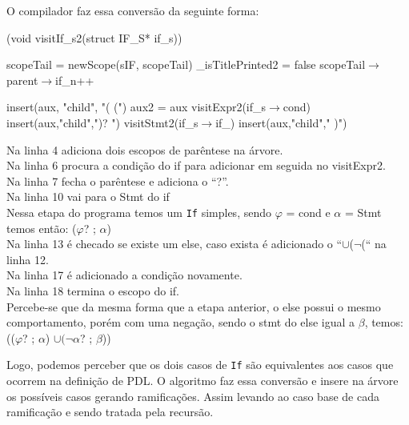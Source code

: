 \documentclass{article}
\newcommand\bruno[1]{({\color{red}#1})}
\begin{document}
	 O compilador faz essa conversão da seguinte forma:\\
	
	\BlankLine
	\begin{algorithm}[H]
		\caption{(void visitIf\_s2(struct IF\_S* if\_s))}
		scopeTail = newScope(sIF, scopeTail)\;
		\_isTitlePrinted2 = false\;
		scopeTail$\rightarrow$parent$\rightarrow$if\_n++\;
		
		insert(aux, "child", "( (")\;
		aux2 = aux\;
		visitExpr2(if\_s$\rightarrow$cond)\;
		insert(aux,"child",")? ")\;
		visitStmt2(if\_s$\rightarrow$if\_)\;
		insert(aux,"child"," )")\;
	\end{algorithm}
	\begin{flushleft}
	Na linha 4 adiciona dois escopos de parêntese na árvore. \\
	Na linha 6 procura a condição do if para adicionar em seguida no visitExpr2. \\
	Na linha 7 fecha o parêntese e adiciona o “?”.\\
	Na linha 10 vai para o Stmt do if\\
	Nessa etapa do programa temos um \texttt{If} simples, sendo $\varphi$ = cond e $\alpha$ = Stmt temos então: ($\varphi$? ; $\alpha$) \\
	Na linha 13 é checado se existe um else, caso exista é adicionado o “$\cup$\label{key}($\neg$(“ na  linha 12. \\
	Na linha 17 é adicionado a condição novamente.\\
	Na linha 18 termina o escopo do if.\\	
	Percebe-se que da mesma forma que a etapa anterior, o else possui o mesmo comportamento, porém com uma negação, sendo o stmt do else igual a $\beta$, temos:\\ (($\varphi$? ; $\alpha$) $\cup   (\neg\alpha$? ; $\beta$)) \\ 
	
	\end{flushleft}%
	Logo, podemos perceber que os dois casos de \texttt{If} são equivalentes %
	aos casos que ocorrem na definição de PDL. O algoritmo faz essa conversão e insere na árvore os possíveis casos gerando ramificações. Assim levando ao caso base de cada ramificação e sendo tratada pela recursão.
\end{document}
